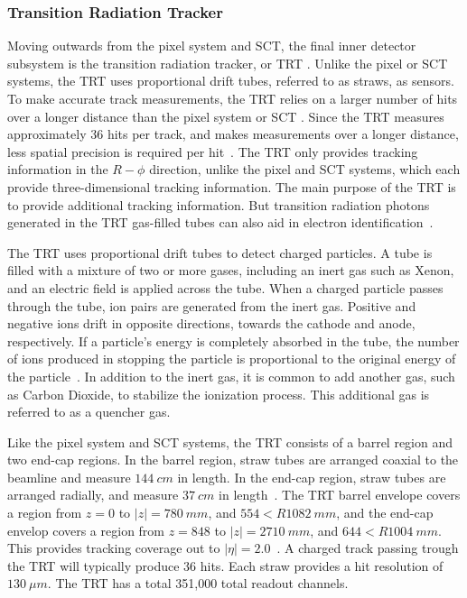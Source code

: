 \subsubsection{Transition Radiation Tracker}\label{subsubsec:trt}
Moving outwards from the pixel system and SCT, the final inner detector subsystem is the transition radiation tracker, or TRT .
Unlike the pixel or SCT systems, the TRT uses proportional drift tubes, referred to as straws, as sensors.
To make accurate track measurements, the TRT relies on a larger number of hits over a longer distance than the pixel system or SCT .
Since the TRT measures approximately 36 hits per track, and makes measurements over a longer distance, less spatial precision is required per hit~\cite{atlas-detector-2008}.
The TRT only provides tracking information in the $R-\phi$ direction, unlike the pixel and SCT systems, which each provide three-dimensional tracking information.
The main purpose of the TRT is to provide additional tracking information.
But transition radiation photons generated in the TRT gas-filled tubes can also aid in electron identification~\cite{atlas-detector-2008}.

The TRT uses proportional drift tubes to detect charged particles.
A tube is filled with a mixture of two or more gases, including an inert gas such as Xenon, and an electric field is applied across the tube.
When a charged particle passes through the tube, ion pairs are generated from the inert gas.
Positive and negative ions drift in opposite directions, towards the cathode and anode, respectively.
If a particle's energy is completely absorbed in the tube, the number of ions produced in stopping the particle is proportional to the original energy of the particle~\cite{knoll-2000}.
In addition to the inert gas, it is common to add another gas, such as Carbon Dioxide, to stabilize the ionization process.
This additional gas is referred to as a quencher gas.

Like the pixel system and SCT systems, the TRT consists of a barrel region and two end-cap regions.
In the barrel region, straw tubes are arranged coaxial to the beamline and measure $144~cm$ in length.
In the end-cap region, straw tubes are arranged radially, and measure $37~cm$ in length~\cite{atlas-detector-2008}.
The TRT barrel envelope covers a region from $z = 0$ to $|z|  = 780~mm$, and $554 < R 1082~mm$, and the end-cap envelop covers a region from $z = 848$ to $|z|  = 2710~mm$, and $644 < R 1004~mm$.
This provides tracking coverage out to $|\eta| = 2.0$~\cite{atlas-detector-2008}.
A charged track passing trough the TRT will typically produce 36 hits.
Each straw provides a hit resolution of $130~\mu m$.
The TRT has a total 351,000 total readout channels.

